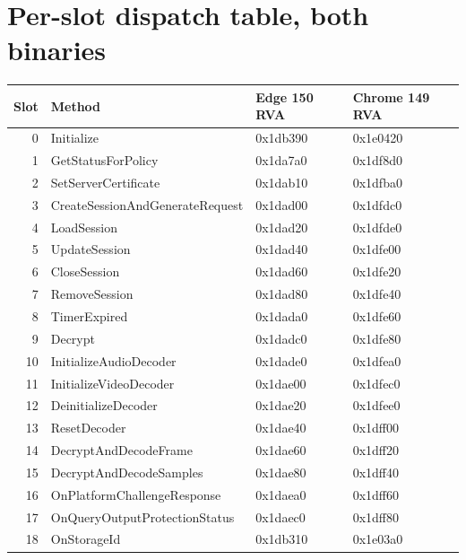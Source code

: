 \documentclass[11pt,letterpaper]{article}
\begin{document}
\appendix

\section{Per-slot dispatch table, both binaries}
\label{app:slot-table}

\begin{center}\footnotesize
\begin{tabular}{rlll}
\toprule
\textbf{Slot} & \textbf{Method} & \textbf{Edge 150 RVA} & \textbf{Chrome 149 RVA} \\
\midrule
0  & Initialize                       & 0x1db390 & 0x1e0420 \\
1  & GetStatusForPolicy                & 0x1da7a0 & 0x1df8d0 \\
2  & SetServerCertificate              & 0x1dab10 & 0x1dfba0 \\
3  & CreateSessionAndGenerateRequest   & 0x1dad00 & 0x1dfdc0 \\
4  & LoadSession                       & 0x1dad20 & 0x1dfde0 \\
5  & UpdateSession                     & 0x1dad40 & 0x1dfe00 \\
6  & CloseSession                      & 0x1dad60 & 0x1dfe20 \\
7  & RemoveSession                     & 0x1dad80 & 0x1dfe40 \\
8  & TimerExpired                      & 0x1dada0 & 0x1dfe60 \\
9  & Decrypt                           & 0x1dadc0 & 0x1dfe80 \\
10 & InitializeAudioDecoder            & 0x1dade0 & 0x1dfea0 \\
11 & InitializeVideoDecoder            & 0x1dae00 & 0x1dfec0 \\
12 & DeinitializeDecoder               & 0x1dae20 & 0x1dfee0 \\
13 & ResetDecoder                      & 0x1dae40 & 0x1dff00 \\
14 & DecryptAndDecodeFrame             & 0x1dae60 & 0x1dff20 \\
15 & DecryptAndDecodeSamples           & 0x1dae80 & 0x1dff40 \\
16 & OnPlatformChallengeResponse       & 0x1daea0 & 0x1dff60 \\
17 & OnQueryOutputProtectionStatus     & 0x1daec0 & 0x1dff80 \\
18 & OnStorageId                       & 0x1db310 & 0x1e03a0 \\
\bottomrule
\end{tabular}
\end{center}
\end{document}
